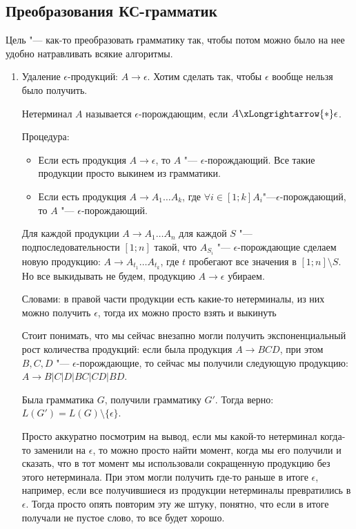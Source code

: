 
\subsection{Преобразования КС-грамматик}
Цель "--- как-то преобразовать грамматику так, чтобы потом можно было на нее удобно натравливать всякие алгоритмы.

\begin{enumerate}
\item
Удаление $\epsilon$-продукций: $A \to \epsilon$. Хотим сделать так, чтобы $\epsilon$ вообще нельзя было получить.

\begin{Def}
Нетерминал $A$ называется $\epsilon$-порождающим, если $A \xLongrightarrow{*} \epsilon$.

Процедура:
\begin{itemize}
\item
Если есть продукция $A \to \epsilon$, то $A$ "--- $\epsilon$-порождающий. Все такие продукции просто выкинем из грамматики.

\item
Если есть продукция $A \to A_1 \dots A_k$, где $\forall i \in [1; k] A_i$"---$\epsilon$-порождающий, то $A$ "--- $\epsilon$-порождающий.
\end{itemize}
\end{Def}

Для каждой продукции $A \to A_1 \dots A_n$ для каждой $S$ "--- подпоследовательности $[1; n]$ такой, что $A_{S_i}$ "--- $\epsilon$-порождающие сделаем новую продукцию:
$A \to A_{t_1} \dots A_{t_k}$, где $t$ пробегают все значения в $[1; n] \setminus S$. Но все выкидывать не будем, продукцию $A \to \epsilon$ убираем.

Словами: в правой части продукции есть какие-то нетерминалы, из них можно получить $\epsilon$, тогда их можно просто взять и выкинуть
\begin{Rem}
Стоит понимать, что мы сейчас внезапно могли получить экспоненциальный рост количества продукций: если была продукция $A \to BCD$, при этом $B, C, D$ "--- $\epsilon$-порождающие, то сейчас
мы получили следующую продукцию: $A \to B | C | D | BC | CD | BD$.
\end{Rem}

Была грамматика $G$, получили грамматику $G'$. Тогда верно: $L(G') = L(G) \setminus \{\epsilon\}$.

Просто аккуратно посмотрим на вывод, если мы какой-то нетерминал когда-то заменили на $\epsilon$, то можно просто найти момент, когда мы его получили и сказать, что в тот момент
мы использовали сокращенную продукцию без этого нетерминала.
При этом могли получить где-то раньше в итоге $\epsilon$, например, если все получившиеся из продукции нетерминалы превратились в $\epsilon$. 
Тогда просто опять повторим эту же штуку, понятно, что если в итоге получали не пустое слово, то все будет хорошо.


\end{enumerate}
